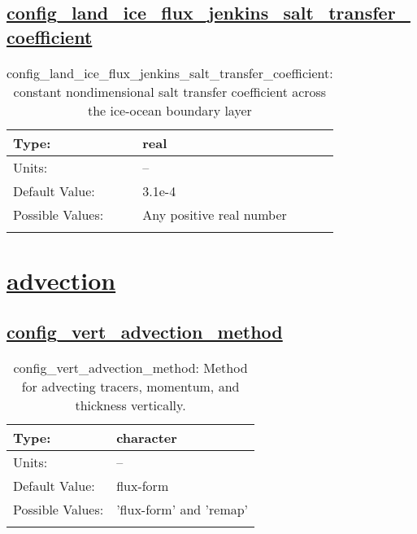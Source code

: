 \subsection[config\_land\_ice\_flux\_jenkins\_salt\_transfer\_coefficient]{\hyperref[sec:nm_tab_land_ice_fluxes]{config\_land\_ice\_flux\_jenkins\_salt\_transfer\_coefficient}}
\label{subsec:nm_sec_config_land_ice_flux_jenkins_salt_transfer_coefficient}
\begin{center}
\begin{longtable}{| p{2.0in} || p{4.0in} |}
    \hline
    Type: & real \\
    \hline
    Units: & -- \\
    \hline
    Default Value: & 3.1e-4 \\
    \hline
    Possible Values: & Any positive real number \\
    \hline
    \caption{config\_land\_ice\_flux\_jenkins\_salt\_transfer\_coefficient: constant nondimensional salt transfer coefficient across the ice-ocean boundary layer}
\end{longtable}
\end{center}
\section[advection]{\hyperref[sec:nm_tab_advection]{advection}}
\label{sec:nm_sec_advection}
\subsection[config\_vert\_advection\_method]{\hyperref[sec:nm_tab_advection]{config\_vert\_advection\_method}}
\label{subsec:nm_sec_config_vert_advection_method}
\begin{center}
\begin{longtable}{| p{2.0in} || p{4.0in} |}
    \hline
    Type: & character \\
    \hline
    Units: & -- \\
    \hline
    Default Value: & flux-form \\
    \hline
    Possible Values: & 'flux-form' and 'remap' \\
    \hline
    \caption{config\_vert\_advection\_method: Method for advecting tracers, momentum, and thickness vertically.}
\end{longtable}
\end{center}

